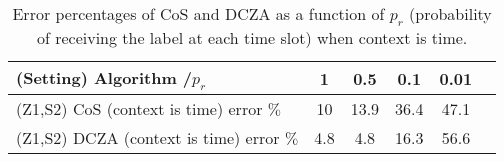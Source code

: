 \begin{table}[t]
\centering
{\fontsize{8}{6}\selectfont
\setlength{\tabcolsep}{.1em}
\begin{tabular}{|l|c|c|c|c|c|}
\hline
(Setting) Algorithm /$p_r$ & 1 & 0.5 & 0.1 & 0.01 \\
\hline
(Z1,S2) CoS (context is time) error $\%$ & 10 & 13.9 & 36.4 & 47.1 \\
\hline
(Z1,S2) DCZA (context is time) error $\%$ & 4.8 & 4.8 & 16.3 & 56.6 \\
\hline
\end{tabular}
}
\caption{Error percentages of CoS and DCZA as a function of $p_r$ (probability of receiving the label at each time slot) when context is time.}
\vspace{-0.2in}
\label{tab:errorperc}
\end{table}